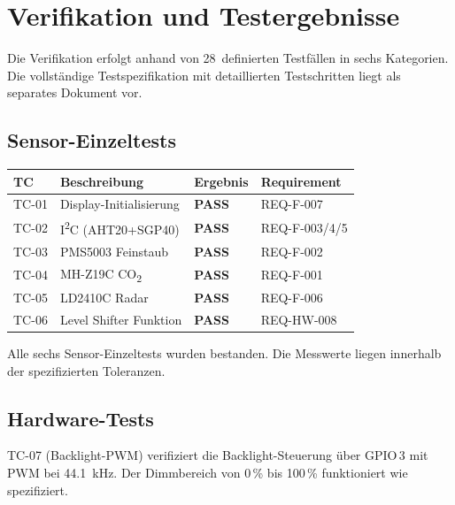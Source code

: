 \section{Verifikation und Testergebnisse}
\label{sec:testing}

Die Verifikation erfolgt anhand von 28~definierten Testfällen in sechs Kategorien. Die vollständige Testspezifikation mit detaillierten Testschritten liegt als separates Dokument vor.

\subsection{Sensor-Einzeltests}

\begin{table}[htb]
\centering
\renewcommand{\arraystretch}{1.3}
\label{tab:sensor_tests}
\begin{tabular}{l p{4cm} l l}
\toprule
\rowcolor{tableheader}
\textbf{TC} & \textbf{Beschreibung} & \textbf{Ergebnis} & \textbf{Requirement} \\
\midrule
TC-01 & Display-Initialisierung & \textcolor{pass}{\textbf{PASS}} & REQ-F-007 \\
TC-02 & I\textsuperscript{2}C (AHT20+SGP40) & \textcolor{pass}{\textbf{PASS}} & REQ-F-003/4/5 \\
TC-03 & PMS5003 Feinstaub & \textcolor{pass}{\textbf{PASS}} & REQ-F-002 \\
TC-04 & MH-Z19C CO\textsubscript{2} & \textcolor{pass}{\textbf{PASS}} & REQ-F-001 \\
TC-05 & LD2410C Radar & \textcolor{pass}{\textbf{PASS}} & REQ-F-006 \\
TC-06 & Level Shifter Funktion & \textcolor{pass}{\textbf{PASS}} & REQ-HW-008 \\
\bottomrule
\end{tabular}
\end{table}

Alle sechs Sensor-Einzeltests wurden bestanden. Die Messwerte liegen innerhalb der spezifizierten Toleranzen.

\subsection{Hardware-Tests}

TC-07 (Backlight-PWM) verifiziert die Backlight-Steuerung über GPIO\,3 mit PWM bei \SI{44,1}{kHz}. Der Dimmbereich von 0\,\% bis 100\,\% funktioniert wie spezifiziert.


